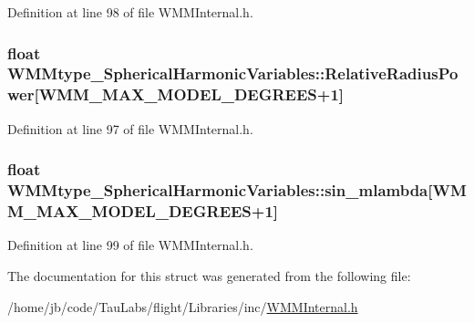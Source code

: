 \-Definition at line 98 of file \-W\-M\-M\-Internal.\-h.

\hypertarget{struct_w_m_mtype___spherical_harmonic_variables_a218814ce7d38806060e4c8e49d14d762}{
\subsubsection[{\-Relative\-Radius\-Power}]{\setlength{\rightskip}{0pt plus 5cm}float {\bf \-W\-M\-Mtype\-\_\-\-Spherical\-Harmonic\-Variables\-::\-Relative\-Radius\-Power}\mbox{[}\-W\-M\-M\-\_\-\-M\-A\-X\-\_\-\-M\-O\-D\-E\-L\-\_\-\-D\-E\-G\-R\-E\-E\-S+1\mbox{]}}}\label{struct_w_m_mtype___spherical_harmonic_variables_a218814ce7d38806060e4c8e49d14d762}


\-Definition at line 97 of file \-W\-M\-M\-Internal.\-h.

\hypertarget{struct_w_m_mtype___spherical_harmonic_variables_a727f5fbba1aeb3141b24ef756f47ef1f}{
\subsubsection[{sin\-\_\-mlambda}]{\setlength{\rightskip}{0pt plus 5cm}float {\bf \-W\-M\-Mtype\-\_\-\-Spherical\-Harmonic\-Variables\-::sin\-\_\-mlambda}\mbox{[}\-W\-M\-M\-\_\-\-M\-A\-X\-\_\-\-M\-O\-D\-E\-L\-\_\-\-D\-E\-G\-R\-E\-E\-S+1\mbox{]}}}\label{struct_w_m_mtype___spherical_harmonic_variables_a727f5fbba1aeb3141b24ef756f47ef1f}


\-Definition at line 99 of file \-W\-M\-M\-Internal.\-h.



\-The documentation for this struct was generated from the following file\-:\begin{DoxyCompactItemize}
\item 
/home/jb/code/\-Tau\-Labs/flight/\-Libraries/inc/\hyperlink{_w_m_m_internal_8h}{\-W\-M\-M\-Internal.\-h}\end{DoxyCompactItemize}
